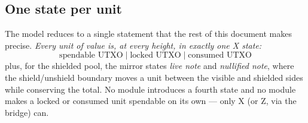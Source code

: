 \subsection{One state per unit}

The model reduces to a single statement that the rest of this document
makes precise. \emph{Every unit of value is, at every height, in exactly
one X state:}
\[
  \text{spendable UTXO} \;\big|\;
  \text{locked UTXO} \;\big|\;
  \text{consumed UTXO}
\]
plus, for the shielded pool, the mirror states \emph{live note} and
\emph{nullified note}, where the shield/unshield boundary moves a unit
between the visible and shielded sides while conserving the total. No
module introduces a fourth state and no module makes a locked or
consumed unit spendable on its own --- only X (or Z, via the bridge)
can.
